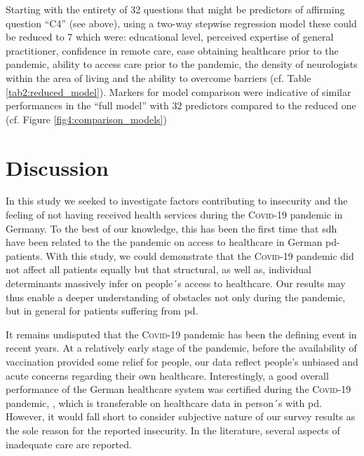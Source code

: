 \documentclass{bmcart}
\begin{document}

Starting with the entirety of 32 questions that might be predictors of affirming question ``C4'' (see above), using a two-way stepwise regression model these could be reduced to 7 which were: educational level, perceived expertise of general practitioner, confidence in remote care, ease obtaining healthcare prior to the pandemic, ability to access care prior to the pandemic, the density of neurologists within the area of living and the ability to overcome barriers (cf. Table \ref{tab2:reduced_model}). Markers for model comparison were indicative of similar performances in the ``full model'' with 32 predictors compared to the reduced one (cf. Figure \ref{fig4:comparison_models})

\newpage

\section*{Discussion}
In this study we seeked to investigate factors contributing to insecurity and the feeling of not having received health services during the \textsc{Covid}-19 pandemic in Germany. To the best of our knowledge, this has been the first time that \ac{sdh} have been related to the the pandemic on access to healthcare in German \ac{pd}-patients. With this study, we could demonstrate that the \textsc{Covid}-19 pandemic did not affect all patients equally but that structural, as well as, individual determinants massively infer on people´s access to healthcare. Our results may thus enable a deeper understanding of obstacles not only during the pandemic, but in general for patients suffering from \ac{pd}. 

It remains undisputed that the \textsc{Covid}-19 pandemic has been the defining event in recent years. At a relatively early stage of the pandemic, before the availability of vaccination provided some relief for people, our data reflect people's unbiased and acute concerns regarding their own healthcare. Interestingly, a good overall performance of the German healthcare system was certified during the \textsc{Covid}-19 pandemic, \cite{10665-341674}, which is transferable on healthcare data in person´s with \ac{pd}\cite{frundt2022impact}. However, it would fall short to consider subjective nature of our survey results as the sole reason for the reported insecurity. In the literature, several aspects of inadequate care are reported. 
\end{document}
